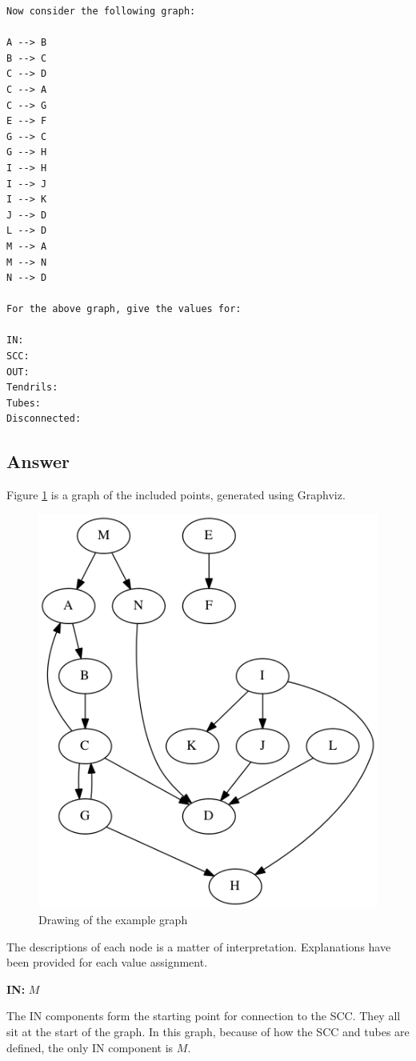 \documentclass[letterpaper,11pt]{article}
\begin{document}
{\begin{verbatim}
Now consider the following graph:

A --> B
B --> C
C --> D
C --> A
C --> G
E --> F
G --> C
G --> H
I --> H
I --> J
I --> K
J --> D 
L --> D
M --> A
M --> N
N --> D
    
For the above graph, give the values for:

IN: 
SCC: 
OUT: 
Tendrils: 
Tubes: 
Disconnected:
\end{verbatim}

\newpage
\subsection*{Answer}
Figure \ref{fig:q3graph} is a graph of the included points, generated using Graphviz.

\begin{figure}
\includegraphics[scale=0.5]{work/q3.png}
\caption{Drawing of the example graph}
\label{fig:q3graph}
\end{figure}

The descriptions of each node is a matter of interpretation.  Explanations have been provided for each value assignment.

\textbf{IN:}  $M$

The IN components form the starting point for connection to the SCC.  They all sit at the start of the graph.  In this graph, because of how the SCC and tubes are defined, the only IN component is $M$.

}
\end{document}
